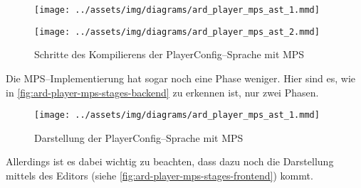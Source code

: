 \begin{figure}[H]
    \begin{framed}
        \texttt{[image: ../assets/img/diagrams/ard\_player\_mps\_ast\_1.mmd]}
    \end{framed}
    \begin{framed}
        \texttt{[image: ../assets/img/diagrams/ard\_player\_mps\_ast\_2.mmd]}
    \end{framed}
    \begin{framed}
        
    \end{framed}
    \caption{Schritte des Kompilierens der PlayerConfig--Sprache mit \acs{MPS}}
    \label{fig:ard-player-mps-stages-backend}
\end{figure}
Die \acs{MPS}--Implementierung hat sogar noch eine Phase weniger.
Hier sind es, wie in \autoref{fig:ard-player-mps-stages-backend} zu erkennen ist, nur zwei Phasen.

\begin{figure}[H]
    \begin{framed}
        
    \end{framed}
    \begin{framed}
        \texttt{[image: ../assets/img/diagrams/ard\_player\_mps\_ast\_1.mmd]}
    \end{framed}
    \caption{Darstellung der PlayerConfig--Sprache mit \acs{MPS}}
    \label{fig:ard-player-mps-stages-frontend}
\end{figure}
Allerdings ist es dabei wichtig zu beachten, dass dazu noch die Darstellung mittels des Editors (siehe \autoref{fig:ard-player-mps-stages-frontend}) kommt.

